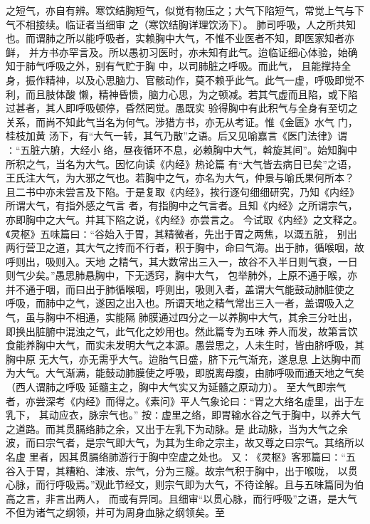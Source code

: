 \documentclass[a4paper,12pt,UTF8,twoside]{ctexbook}
\begin{document}
之短气，亦自有辨。寒饮结胸短气，似觉有物压之；大气下陷短气，常觉上气与下气不相接续。临证者当细审 
之（寒饮结胸详理饮汤下）。 
肺司呼吸，人之所共知也。而谓肺之所以能呼吸者，实赖胸中大气，不惟不业医者不知，即医家知者亦鲜， 
并方书亦罕言及。所以愚初习医时，亦未知有此气。迨临证细心体验，始确知于肺气呼吸之外，别有气贮于胸 
中，以司肺脏之呼吸。而此气， 
且能撑持全身，振作精神，以及心思脑力、官骸动作，莫不赖乎此气。此气一虚，呼吸即觉不利，而且肢体酸 
懒，精神昏愦，脑力心思，为之顿减。若其气虚而且陷，或下陷过甚者，其人即呼吸顿停，昏然罔觉。愚既实 
验得胸中有此积气与全身有至切之关系，而尚不知此气当名为何气。涉猎方书，亦无从考证。惟《金匮》水气 
门，桂枝加黄 汤下，有“大气一转，其气乃散”之语。后又见喻嘉言《医门法律》谓∶“五脏六腑，大经小 
络，昼夜循环不息，必赖胸中大气，斡旋其间”。始知胸中所积之气，当名为大气。因忆向读《内经》热论篇 
有“大气皆去病日已矣”之语，王氏注大气，为大邪之气也。若胸中之气，亦名为大气，仲景与喻氏果何所本？ 
且二书中亦未尝言及下陷。于是复取《内经》，挨行逐句细细研究，乃知《内经》所谓大气，有指外感之气言 
者，有指胸中之气言者。且知《内经》之所谓宗气，亦即胸中之大气。并其下陷之说，《内经》亦尝言之。 
今试取《内经》之文释之。《灵枢》五味篇曰∶“谷始入于胃，其精微者，先出于胃之两焦，以溉五脏， 
别出两行营卫之道，其大气之抟而不行者，积于胸中，命曰气海。出于肺，循喉咽，故呼则出，吸则入。天地 
之精气，其大数常出三入一，故谷不入半日则气衰，一日则气少矣。”愚思肺悬胸中，下无透窍，胸中大气， 
包举肺外，上原不通于喉，亦并不通于咽，而曰出于肺循喉咽，呼则出，吸则入者，盖谓大气能鼓动肺脏使之 
呼吸，而肺中之气，遂因之出入也。所谓天地之精气常出三入一者，盖谓吸入之气，虽与胸中不相通，实能隔 
肺膜通过四分之一以养胸中大气，其余三分吐出，即换出脏腑中混浊之气，此气化之妙用也。然此篇专为五味 
养人而发，故第言饮食能养胸中大气，而实未发明大气之本源。愚尝思之，人未生时，皆由脐呼吸，其胸中原 
无大气，亦无需乎大气。迨胎气日盛，脐下元气渐充，遂息息 
上达胸中而为大气。大气渐满，能鼓动肺膜使之呼吸，即脱离母腹，由肺呼吸而通天地之气矣（西人谓肺之呼吸 
延髓主之，胸中大气实又为延髓之原动力）。 
至大气即宗气者，亦尝深考《内经》而得之。《素问》平人气象论曰∶“胃之大络名虚里，出于左乳下， 
其动应衣，脉宗气也。” 
按∶虚里之络，即胃输水谷之气于胸中，以养大气之道路。而其贯膈络肺之余，又出于左乳下为动脉。是 
此动脉，当为大气之余波，而曰宗气者，是宗气即大气，为其为生命之宗主，故又尊之曰宗气。其络所以名虚 
里者，因其贯膈络肺游行于胸中空虚之处也。 
又∶《灵枢》客邪篇曰∶“五谷入于胃，其糟粕、津液、宗气，分为三隧。故宗气积于胸中，出于喉咙， 
以贯心脉，而行呼吸焉。”观此节经文，则宗气即为大气，不待诠解。且与五味篇同为伯高之言，非言出两人， 
而或有异同。且细审“以贯心脉，而行呼吸”之语，是大气不但为诸气之纲领，并可为周身血脉之纲领矣。至 
\end{document}
